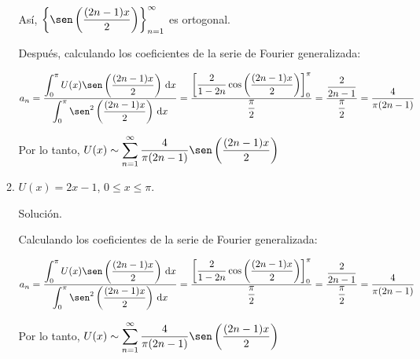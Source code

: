 \documentclass[fleqn]{article}
\newcommand{\integ}[3]{\displaystyle \int_{#1}^{#2} #3 \, \mathrm{d} x}
\begin{document}
\begin{enumerate}[I.]
\begin{enumerate}
                Así, $ \left\lbrace \sen \left( \dfrac{(2n - 1) x}{2} \right) \right\rbrace_{n=1}^{\infty} $ es ortogonal.

                Después, calculando los coeficientes de la serie de Fourier generalizada:

                \begin{align*}
                    a_n = \dfrac{\integ{0}{\pi}{U(x) \sen \left( \dfrac{(2n - 1) x}{2} \right)}}{\integ{0}{\pi}{\sen^2 \left( \dfrac{(2n - 1) x}{2} \right)}} 
                    = \dfrac{\left[ \dfrac{2}{1 - 2n} \cos \left( \dfrac{(2n - 1) x}{2} \right) \right]_{0}^{\pi}}{\dfrac{\pi}{2}} 
                    = \dfrac{\dfrac{2}{2n - 1}}{\dfrac{\pi}{2}} 
                    = \dfrac{4}{\pi (2n - 1)}
                \end{align*}

                Por lo tanto, $ U(x) \sim \displaystyle \sum_{n=1}^{\infty} \dfrac{4}{\pi (2n - 1)} \sen \left( \dfrac{(2n - 1) x}{2} \right) $


			\bfseries
			
			\item $ U(x) = 2x - 1 $, $ 0 \leq x \leq \pi $.
			
			Solución.
			
			\normalfont

			Calculando los coeficientes de la serie de Fourier generalizada:

                \begin{align*}
                    a_n = \dfrac{\integ{0}{\pi}{U(x) \sen \left( \dfrac{(2n - 1) x}{2} \right)}}{\integ{0}{\pi}{\sen^2 \left( \dfrac{(2n - 1) x}{2} \right)}} 
                    = \dfrac{\left[ \dfrac{2}{1 - 2n} \cos \left( \dfrac{(2n - 1) x}{2} \right) \right]_{0}^{\pi}}{\dfrac{\pi}{2}} 
                    = \dfrac{\dfrac{2}{2n - 1}}{\dfrac{\pi}{2}} 
                    = \dfrac{4}{\pi (2n - 1)}
                \end{align*}

                Por lo tanto, $ U(x) \sim \displaystyle \sum_{n=1}^{\infty} \dfrac{4}{\pi (2n - 1)} \sen \left( \dfrac{(2n - 1) x}{2} \right) $

		\end{enumerate}


\end{enumerate}
\end{document}
